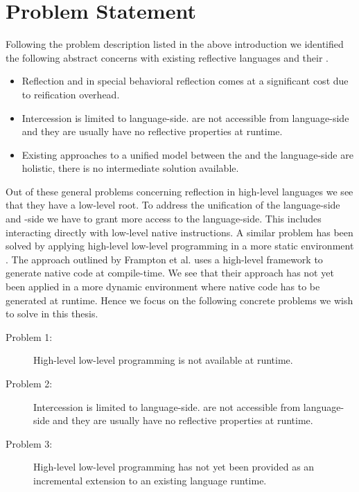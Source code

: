 \section{Problem Statement}
Following the problem description listed in the above introduction we identified the following abstract concerns with existing reflective languages and their \VMs.
%
\begin{itemize}
	\item Reflection and in special behavioral reflection comes at a significant cost due to reification overhead.
		
	\item Intercession is limited to language-side.
	\VMs are not accessible from language-side and they are usually have no reflective properties at runtime. 
	
	\item Existing approaches to a unified model between the \VM and the language-side are holistic, there is no intermediate solution available.
\end{itemize}

\noindent Out of these general problems concerning reflection in high-level languages we see that they have a low-level root.
To address the unification of the language-side and \VM-side we have to grant more access to the language-side.
This includes interacting directly with low-level native instructions.
A similar problem has been solved by applying high-level low-level programming in a more static environment \cite{Fram09a,Graal}.
The approach outlined by Frampton et al. uses a high-level framework to generate native code at compile-time.
We see that their approach has not yet been applied in a more dynamic environment where native code has to be generated at runtime.
Hence we focus on the following concrete problems we wish to solve in this thesis.

\begin{description}
	\item[Problem 1:] High-level low-level programming is not available at runtime.
	
	\item[Problem 2:] Intercession is limited to language-side.
	\VMs are not accessible from language-side and they are usually have no reflective properties at runtime.
	
	\item[Problem 3:] High-level low-level programming has not yet been provided as an incremental extension to an existing language runtime.
\end{description}

